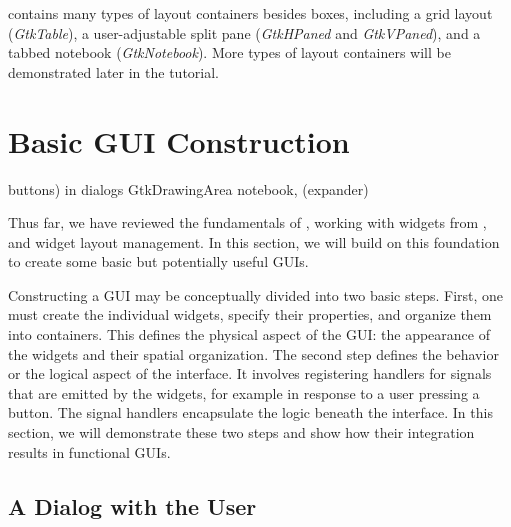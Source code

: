 \documentclass[article]{jss}
\begin{document}
 contains many types of layout containers besides boxes,
including 
a grid layout (\emph{GtkTable}), a user-adjustable split pane
(\emph{GtkHPaned}
and \emph{GtkVPaned}), and a tabbed notebook (\emph{GtkNotebook}).
More types of
layout containers will be demonstrated later in the tutorial.

\section{Basic GUI Construction}

buttons)
in dialogs
GtkDrawingArea
notebook, (expander)

Thus far, we have reviewed the fundamentals of , working
with
 widgets from , and widget layout management. In
this
section, we will build on this foundation to create some basic but
potentially
useful GUIs. 

Constructing a GUI may be conceptually divided into two basic steps.
First, one must create the individual widgets, specify their
properties,
and organize them into containers. This defines the physical aspect
of the GUI: the appearance of the widgets and their spatial
organization.
The second step defines the behavior or the logical aspect of the
interface. It involves registering handlers for signals that are
emitted
by the widgets, for example in response to a user pressing a button.
The signal handlers encapsulate the logic beneath the interface. In
this
section, we will demonstrate these two steps and show how their
integration
results in functional GUIs.

\subsection{A Dialog with the User}\label{sec:dialog-example}
\end{document}
